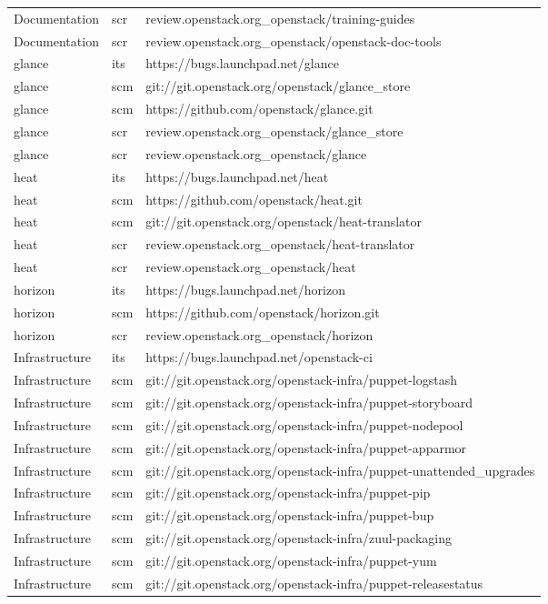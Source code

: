 \begin{center}
\begin{longtable}{|p{4cm}|p{1cm}|p{10cm}|}
Documentation&scr&review.openstack.org\_openstack/training-guides\\
Documentation&scr&review.openstack.org\_openstack/openstack-doc-tools\\
glance&its&https://bugs.launchpad.net/glance\\
glance&scm&git://git.openstack.org/openstack/glance\_store\\
glance&scm&https://github.com/openstack/glance.git\\
glance&scr&review.openstack.org\_openstack/glance\_store\\
glance&scr&review.openstack.org\_openstack/glance\\
heat&its&https://bugs.launchpad.net/heat\\
heat&scm&https://github.com/openstack/heat.git\\
heat&scm&git://git.openstack.org/openstack/heat-translator\\
heat&scr&review.openstack.org\_openstack/heat-translator\\
heat&scr&review.openstack.org\_openstack/heat\\
horizon&its&https://bugs.launchpad.net/horizon\\
horizon&scm&https://github.com/openstack/horizon.git\\
horizon&scr&review.openstack.org\_openstack/horizon\\
Infrastructure&its&https://bugs.launchpad.net/openstack-ci\\
Infrastructure&scm&git://git.openstack.org/openstack-infra/puppet-logstash\\
Infrastructure&scm&git://git.openstack.org/openstack-infra/puppet-storyboard\\
Infrastructure&scm&git://git.openstack.org/openstack-infra/puppet-nodepool\\
Infrastructure&scm&git://git.openstack.org/openstack-infra/puppet-apparmor\\
Infrastructure&scm&git://git.openstack.org/openstack-infra/puppet-unattended\_upgrades\\
Infrastructure&scm&git://git.openstack.org/openstack-infra/puppet-pip\\
Infrastructure&scm&git://git.openstack.org/openstack-infra/puppet-bup\\
Infrastructure&scm&git://git.openstack.org/openstack-infra/zuul-packaging\\
Infrastructure&scm&git://git.openstack.org/openstack-infra/puppet-yum\\
Infrastructure&scm&git://git.openstack.org/openstack-infra/puppet-releasestatus\\

\end{longtable}
\end{center}
